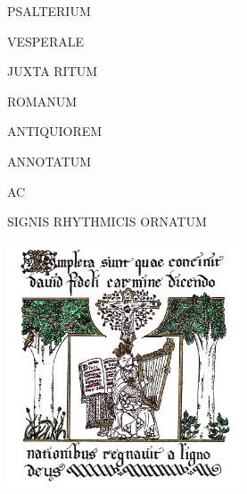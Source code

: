 






\begin{center}

\color{benred8}

{\fontsize{2.660cm}{5 em}\selectfont

PSALTERIUM

}

\vspace*{15 pt}

{\fontsize{2.975cm}{5 em}\selectfont

VESPERALE

}

\vspace*{20 pt}

{\fontsize{1.5cm}{1 em}\selectfont

JUXTA RITUM

\vspace*{2.7 mm}

ROMANUM

\vspace*{5 mm}

ANTIQUIOREM

}

\vspace*{5 mm}

\begin{Huge}

ANNOTATUM

\end{Huge}\begin{Large}

AC

\vspace*{-1.0 mm}

\end{Large}\begin{Huge}

SIGNIS RHYTHMICIS ORNATUM

\end{Huge}

\vspace*{8 mm}

\includegraphics[height=7.20cm]{David2017s.png}


\end{center}
